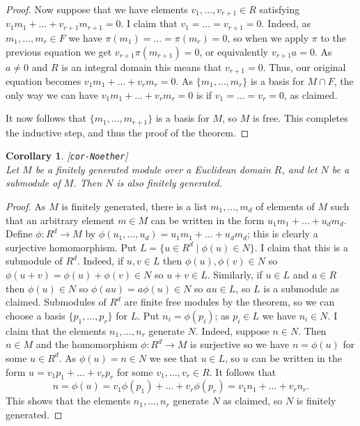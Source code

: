 \documentclass{amsart}
\newcommand{\lbl}[1]{\label{#1}\textup{[\texttt{#1}]}\ \\}
\newcommand{\lbl}{\label}
\newcommand{\xra}       {\xrightarrow}
\newcommand{\st}        {\;|\;}
\renewcommand{\:}{\colon}
\newtheorem{corollary}[theorem]{Corollary}
\theoremstyle{definition}
\begin{document}
\begin{proof}
 Now suppose that we have elements $v_1,\ldots,v_{r+1}\in R$
 satisfying $v_1m_1+\ldots+v_{r+1}m_{r+1}=0$.  I claim that
 $v_1=\ldots=v_{r+1}=0$.  Indeed, as $m_1,\ldots,m_r\in F$ we have
 $\pi(m_1)=\ldots=\pi(m_r)=0$, so when we apply $\pi$ to the previous
 equation we get $v_{r+1}\pi(m_{r+1})=0$, or equivalently
 $v_{r+1}a=0$.  As $a\neq 0$ and $R$ is an integral domain this means
 that $v_{r+1}=0$.  Thus, our original equation becomes
 $v_1m_1+\ldots+v_rm_r=0$.  As $\{m_1,\ldots,m_r\}$ is a basis for
 $M\cap F$, the only way we can have $v_1m_1+\ldots+v_rm_r=0$ is if
 $v_1=\ldots=v_r=0$, as claimed. 

 It now follows that $\{m_1,\ldots,m_{r+1}\}$ is a basis for $M$, so
 $M$ is free.  This completes the inductive step, and thus the proof
 of the theorem.
\end{proof}

\begin{corollary}\lbl{cor-Noether}
 Let $M$ be a finitely generated module over a Euclidean domain $R$,
 and let $N$ be a submodule of $M$.  Then $N$ is also finitely
 generated.
\end{corollary}
\begin{proof}
 As $M$ is finitely generated, there is a list $m_1,\ldots,m_d$ of
 elements of $M$ such that an arbitrary element $m\in M$ can be
 written in the form $u_1m_1+\ldots+u_dm_d$.  Define
 $\phi\:R^d\xra{}M$ by $\phi(u_1,\ldots,u_d)=u_1m_1+\ldots+u_dm_d$;
 this is clearly a surjective homomorphism. 
 Put $L=\{u\in R^d\st\phi(u)\in N\}$.  I claim that this is a
 submodule of $R^d$.  Indeed, if $u,v\in L$ then
 $\phi(u),\phi(v)\in N$ so $\phi(u+v)=\phi(u)+\phi(v)\in N$ so
 $u+v\in L$.  Similarly, if $u\in L$ and $a\in R$ then $\phi(u)\in N$
 so $\phi(au)=a\phi(u)\in N$ so $au\in L$, so $L$ is a submodule as
 claimed.  Submodules of $R^d$ are finite free modules by the theorem,
 so we can choose a basis $\{p_1,\ldots,p_r\}$ for $L$.  Put
 $n_i=\phi(p_i)$; as $p_i\in L$ we have $n_i\in N$.  I claim that the
 elements $n_1,\ldots,n_r$ generate $N$.  Indeed, suppose $n\in N$.
 Then $n\in M$ and the homomorphism $\phi\:R^d\xra{}M$ is surjective
 so we have $n=\phi(u)$ for some $u\in R^d$.  As $\phi(u)=n\in N$ we
 see that $u\in L$, so $u$ can be written in the form
 $u=v_1p_1+\ldots+v_rp_r$ for some $v_1,\ldots,v_r\in R$.  It follows
 that
 \[ n=\phi(u)=v_1\phi(p_1)+\ldots+v_r\phi(p_r)=v_1n_1+\ldots+v_rn_r.
 \]
 This shows that the elements $n_1,\ldots,n_r$ generate $N$ as
 claimed, so $N$ is finitely generated. 
\end{proof}
\end{document}
